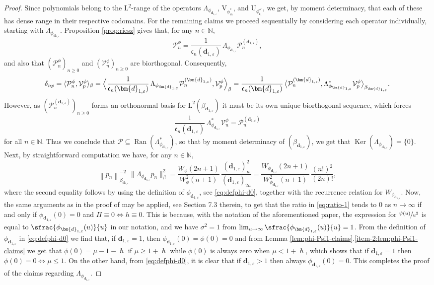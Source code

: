 \documentclass[JEP,XML,SOM,Unicode]{cedram}
\let\epsilon\varepsilon
\theoremstyle{plain}
\theoremstyle{definition}
\newcommand{\norm}[1]{\left\lVert#1\right\rVert}
\newcommand{\bnorm}[1]{\bigl\lVert#1\bigr\rVert}
\DeclareMathOperator{\Ran}{Ran}
\DeclareMathOperator{\Ker}{Ker}
\newcommand{\N}{\mathbb{N}}
\newcommand{\Poly}{\mathscr{P}}
\renewcommand{\P}{\mathcal{P}}
\newcommand{\V}{\mathcal{V}}
\newcommand{\Leb}{\mathrm{L}}
\newcommand{\m}{\mathfrak{m}}
\newcommand{\dz}{{\bm{d}}_{1,\epsilon}}
\newcommand{\lam}{{\bm{\lambda}_1}}
\newcommand{\vat}{{\mathsf{r}_1}}
\newcommand{\phm}{{\phi_\m^*}}
\renewcommand{\varphi}{{\phi_{\vat}^{\checkmark}}}
\newcommand{\gab}[1][\lam,\mo]{{\beta_{#1}}}
\let\h\hslash
\let\mo\mu
\let\bpsi\beta
\begin{document}
\begin{proof}
Since polynomials belong to the $\Leb^2$-range of the operators $\Lambda_{\phi_{\dz}}$, $\mathrm{V}_{\phm}$, and $\mathrm{U}_\varphi$, we get, by moment determinacy, that each of these has dense range in their respective codomains. For the remaining claims we proceed sequentially by considering each operator individually, starting with $\Lambda_{\phi_{\dz}}$. Proposition \ref{prop:riesz} gives that, for any $n \in \N$,
\begin{equation*}
\P_n^\phi = \frac{1}{\mathfrak{c}_n(\dz)}\,\Lambda_{\phi_{\dz}} \P_n^{(\dz)},
\end{equation*}
and also that $(\P_n^\phi)_{n \geq 0}$ and $(\V_n^\phi)_{n \geq 0}$ are biorthogonal. Consequently,
\begin{equation*}
\delta_{np} = \langle \P_n^\phi, \V_p^\phi\rangle_\bpsi = \Bigl \langle \frac{1}{\mathfrak{c}_n(\dz)}\,\Lambda_{\phi_{\dz}} \P_n^{(\dz)}, \V_p^\phi \Bigr\rangle_\bpsi = \frac{1}{\mathfrak{c}_n(\dz)}\, \bigl\langle \P_n^{(\dz)}, \Lambda_{\phi_{\dz}}^* \V_p^\phi \bigr\rangle_{\gab[\dz]}.
\end{equation*}
However, as $(\P_n^{(\dz)})_{n \geq 0}$ forms an orthonormal basis for $\Leb^2(\gab[\dz])$ it must be its own unique biorthogonal sequence, which forces
\begin{equation*}
\frac{1}{\mathfrak{c}_n(\dz)}\,\Lambda_{\phi_{\dz}}^* \V_n^\phi = \P_n^{(\dz)}
\end{equation*}
for all $n \in \N$. Thus we conclude that $\Poly \subseteq \Ran(\Lambda_{\phi_{\dz}}^*)$, so that by moment determinacy of $(\gab[\dz])$, we get that $\Ker(\Lambda_{\phi_{\dz}}) = \{0\}$. Next, by straightforward computation we have, for any $n \in \N$,
\begin{equation}
\label{eq:ratio-1}
\norm{p_n}_{\gab[\dz]}^{-2}\bnorm{\Lambda_{\phi_{\dz}} p_n}_\bpsi^2 = \frac{W_\phi(2n+1)}{W_\phi^2(n+1)}\,\frac{(\dz)_n^2}{(\dz)_{2n}} = \frac{W_{\phi_{\dz}}(2n+1)}{W_{\phi_{\dz}}^2(n+1)}\,\frac{(n!)^2}{(2n)!},
\end{equation}
where the second equality follows by using the definition of $\phi_{\dz}$, see \eqref{eq:defphi-d0}, together with the recurrence relation for $W_{\phi_{\dz}}$. Now, the same arguments as in the proof of \cite[Th.\,7.1(2)]{Patie-Savov-GeL} may be applied, see \eg Section 7.3 therein, to get that the ratio in \eqref{eq:ratio-1} tends to 0 as $n \to \infty$ if and only if $\phi_{\dz}(0) = 0$ and $\Pi \equiv 0 \Leftrightarrow h \equiv 0$. This is because, with the notation of the aforementioned paper, the expression for $\sfrac{\psi(u)}{u^2}$ is equal to $\sfrac{\phi_{\dz}(u)}{u}$ in our notation, and we have $\sigma^2 = 1$ from $\lim_{u \to \infty} \sfrac{\phi_{\dz}(u)}{u} = 1$. From the definition of $\phi_{\dz}$ in \eqref{eq:defphi-d0} we find that, if $\dz = 1$, then $\phi_{\dz}(0) = \phi(0) = 0$ and from Lemma \ref{lem:phi-Psi1-claims}.\eqref{item-2:lem:phi-Psi1-claims} we get that $\phi(0) = \mo-1-\h$ if $\mo \geq 1+\h$ while $\phi(0)$ is always zero when $\mo < 1+\h$, which shows that if $\dz =1$ then $\phi(0)=0 \Leftrightarrow \mo \leq 1$. On the other hand, from \eqref{eq:defphi-d0}, it is clear that if $\dz > 1$ then always $\phi_{\dz}(0)=0$. This completes the proof of the claims regarding $\Lambda_{\phi_{\dz}}$.

\end{proof}
\end{document}

